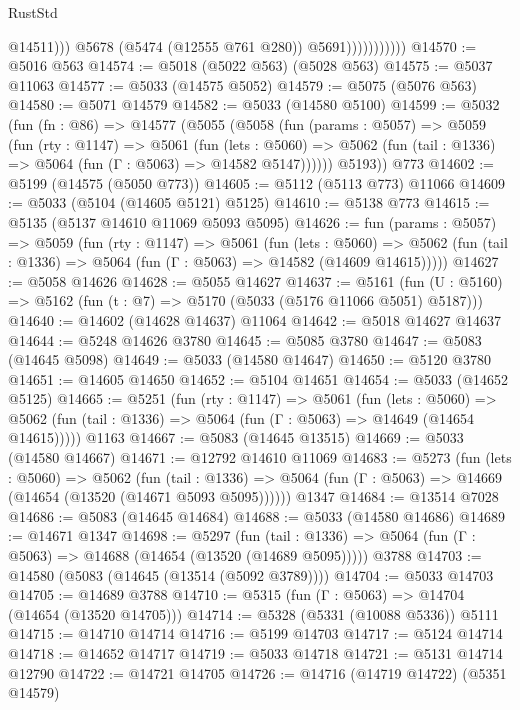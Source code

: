 \begin{lexlean}{RustStd}
\begin{coremodule}
                                @14511)))
                          @5678
                          (@5474 (@12555 @761 @280))
                          @5691)))))))))))
@14570 := @5016 @563
@14574 := @5018 (@5022 @563) (@5028 @563)
@14575 := @5037 @11063
@14577 := @5033 (@14575 @5052)
@14579 := @5075 (@5076 @563)
@14580 := @5071 @14579
@14582 := @5033 (@14580 @5100)
@14599 := @5032
    (fun (fn : @86) =>
    @14577
      (@5055
        (@5058
          (fun (params : @5057) =>
          @5059
            (fun (rty : @1147) =>
            @5061
              (fun (lets : @5060) =>
              @5062 (fun (tail : @1336) => @5064 (fun (Γ : @5063) => @14582 @5147))))))
        @5193))
    @773
@14602 := @5199 (@14575 (@5050 @773))
@14605 := @5112 (@5113 @773) @11066
@14609 := @5033 (@5104 (@14605 @5121) @5125)
@14610 := @5138 @773
@14615 := @5135 (@5137 @14610 @11069 @5093 @5095)
@14626 := fun (params : @5057) =>
  @5059
    (fun (rty : @1147) =>
    @5061
      (fun (lets : @5060) =>
      @5062 (fun (tail : @1336) => @5064 (fun (Γ : @5063) => @14582 (@14609 @14615)))))
@14627 := @5058 @14626
@14628 := @5055 @14627
@14637 := @5161
    (fun (U : @5160) => @5162 (fun (t : @7) => @5170 (@5033 (@5176 @11066 @5051) @5187)))
@14640 := @14602 (@14628 @14637) @11064
@14642 := @5018 @14627 @14637
@14644 := @5248 @14626 @3780
@14645 := @5085 @3780
@14647 := @5083 (@14645 @5098)
@14649 := @5033 (@14580 @14647)
@14650 := @5120 @3780
@14651 := @14605 @14650
@14652 := @5104 @14651
@14654 := @5033 (@14652 @5125)
@14665 := @5251
    (fun (rty : @1147) =>
    @5061
      (fun (lets : @5060) =>
      @5062 (fun (tail : @1336) => @5064 (fun (Γ : @5063) => @14649 (@14654 @14615)))))
    @1163
@14667 := @5083 (@14645 @13515)
@14669 := @5033 (@14580 @14667)
@14671 := @12792 @14610 @11069
@14683 := @5273
    (fun (lets : @5060) =>
    @5062
      (fun (tail : @1336) =>
      @5064 (fun (Γ : @5063) => @14669 (@14654 (@13520 (@14671 @5093 @5095))))))
    @1347
@14684 := @13514 @7028
@14686 := @5083 (@14645 @14684)
@14688 := @5033 (@14580 @14686)
@14689 := @14671 @1347
@14698 := @5297
    (fun (tail : @1336) => @5064 (fun (Γ : @5063) => @14688 (@14654 (@13520 (@14689 @5095)))))
    @3788
@14703 := @14580 (@5083 (@14645 (@13514 (@5092 @3789))))
@14704 := @5033 @14703
@14705 := @14689 @3788
@14710 := @5315 (fun (Γ : @5063) => @14704 (@14654 (@13520 @14705)))
@14714 := @5328 (@5331 (@10088 @5336)) @5111
@14715 := @14710 @14714
@14716 := @5199 @14703
@14717 := @5124 @14714
@14718 := @14652 @14717
@14719 := @5033 @14718
@14721 := @5131 @14714 @12790
@14722 := @14721 @14705
@14726 := @14716 (@14719 @14722) (@5351 @14579)

\end{coremodule}
\end{lexlean}
